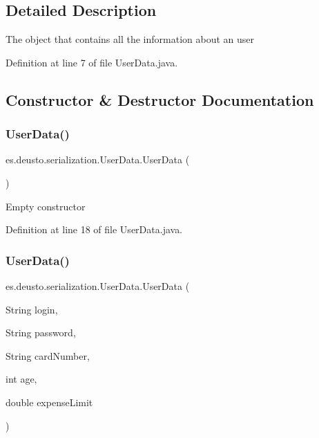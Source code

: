 \subsection{Detailed Description}
The object that contains all the information about an user~\newline


Definition at line 7 of file User\+Data.\+java.



\subsection{Constructor \& Destructor Documentation}
\mbox{\label{classes_1_1deusto_1_1serialization_1_1_user_data_a7bd940bf1869b9c6f8e7161e8ee38121}} 
\subsubsection{\texorpdfstring{User\+Data()}{UserData()}\hspace{0.1cm}{\footnotesize\ttfamily [1/2]}}
{\footnotesize\ttfamily es.\+deusto.\+serialization.\+User\+Data.\+User\+Data (\begin{DoxyParamCaption}{ }\end{DoxyParamCaption})}

Empty constructor 

Definition at line 18 of file User\+Data.\+java.

\mbox{\label{classes_1_1deusto_1_1serialization_1_1_user_data_a1e5467f049328c59142c240f52dec0ec}} 
\subsubsection{\texorpdfstring{User\+Data()}{UserData()}\hspace{0.1cm}{\footnotesize\ttfamily [2/2]}}
{\footnotesize\ttfamily es.\+deusto.\+serialization.\+User\+Data.\+User\+Data (\begin{DoxyParamCaption}\item[{String}]{login,  }\item[{String}]{password,  }\item[{String}]{card\+Number,  }\item[{int}]{age,  }\item[{double}]{expense\+Limit }\end{DoxyParamCaption})}

